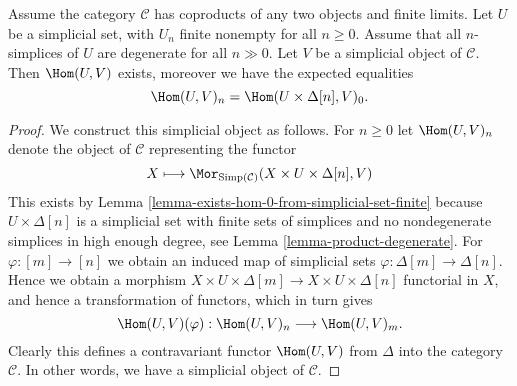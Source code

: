 \begin{lemma}
\label{lemma-exists-hom-from-simplicial-set-finite}
Assume the category $\mathcal{C}$
has coproducts of any two objects and finite
limits. Let $U$ be a simplicial set, with $U_n$ finite nonempty
for all $n \geq 0$. Assume that all $n$-simplices
of $U$ are degenerate for all $n \gg 0$.
Let $V$ be a simplicial object of $\mathcal{C}$.
Then $\Hom(U, V)$ exists, moreover
we have the expected equalities
$$
\Hom(U, V)_n = \Hom(U \times \Delta[n], V)_0.
$$
\end{lemma}

\begin{proof}
We construct this simplicial object as follows.
For $n \geq 0$ let $\Hom(U, V)_n$ denote
the object of $\mathcal{C}$ representing the
functor
$$
X
\longmapsto
\Mor_{\text{Simp}(\mathcal{C})}(X \times U \times \Delta[n], V)
$$
This exists by Lemma \ref{lemma-exists-hom-0-from-simplicial-set-finite}
because $U \times \Delta[n]$ is a simplicial set with finite
sets of simplices and no nondegenerate simplices in high enough degree,
see Lemma \ref{lemma-product-degenerate}.
For $\varphi : [m] \to [n]$ we obtain an induced map of simplicial
sets $\varphi : \Delta[m] \to \Delta[n]$. Hence we obtain a morphism
$X \times U \times \Delta[m] \to X \times U \times \Delta[n]$
functorial in $X$, and hence a transformation of functors,
which in turn gives
$$
\Hom(U, V)(\varphi) :
\Hom(U, V)_n
\longrightarrow
\Hom(U, V)_m.
$$
Clearly this defines a contravariant functor
$\Hom(U, V)$ from
$\Delta$ into the category $\mathcal{C}$.
In other words, we have a simplicial object of $\mathcal{C}$.


\end{proof}
